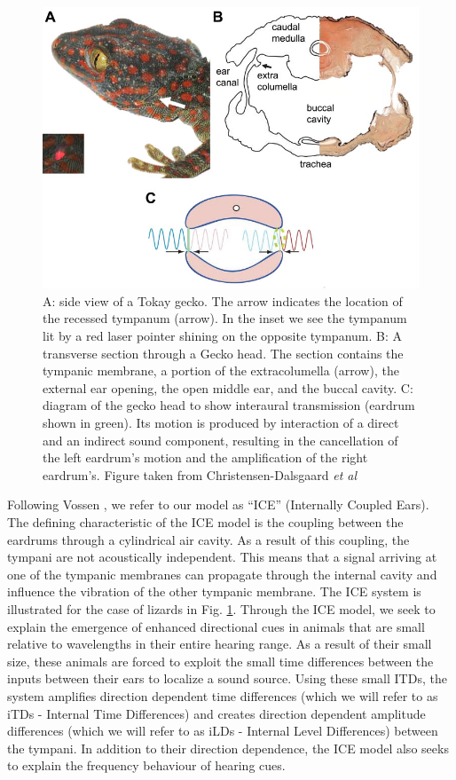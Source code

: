 \begin{figure}[ht]
 \centering
 \includegraphics[width=0.6\linewidth]{Diagrams/geckoICE.jpg}
 \caption[Illustration of ICE for a lizard]{A: side view of a Tokay gecko. The arrow indicates the location of the recessed tympanum (arrow).
 In the inset we see the tympanum lit by a red laser pointer shining on the opposite tympanum. B: A transverse section through a 
 Gecko head. The section contains the tympanic membrane, a portion of the extracolumella (arrow), the external ear opening, the open middle ear, 
 and the buccal cavity. C: diagram of the gecko 
 head to show interaural transmission (eardrum shown in green). Its motion is produced by interaction of a direct and an indirect sound component, resulting in the
 cancellation of the left eardrum's motion and the amplification of the right eardrum's. Figure taken from Christensen-Dalsgaard \emph{et al} \cite{dalsgaardtangcarr}
 }
 \label{geckoICE}
\end{figure}

Following Vossen \cite{vossenjasa},  we refer to our model as ``ICE'' (Internally Coupled Ears). The defining characteristic of the ICE model
is the coupling between the eardrums through a cylindrical air cavity. As a result of this coupling, the tympani are not acoustically independent.
This means that a signal arriving at one of the tympanic membranes can propagate through
the internal cavity and influence the vibration of the other tympanic membrane. The ICE system is illustrated for the case of lizards in Fig. \ref{geckoICE}.
Through the ICE model, we seek to explain the emergence of enhanced directional cues in animals that are small relative to wavelengths
in their entire hearing range. As a result of their small size, these animals are forced to exploit the small time differences between the inputs between
their ears to localize a sound source. Using these small ITDs, the system amplifies direction dependent
 time differences (which we will refer to as iTDs - Internal Time Differences) and  creates direction dependent amplitude differences (which we will
 refer to as iLDs - Internal Level Differences) between the tympani.
In addition to their direction dependence, the ICE model also seeks to explain the frequency behaviour of hearing cues. 
 
